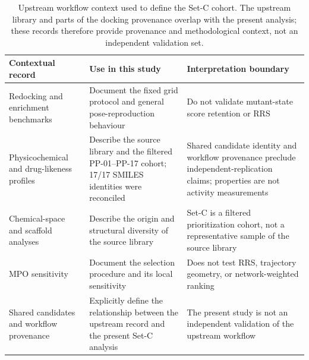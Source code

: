 \begin{table}[htbp]
\centering
\scriptsize
\caption{Upstream workflow context used to define the Set-C cohort. The upstream library and parts of the docking provenance overlap with the present analysis; these records therefore provide provenance and methodological context, not an independent validation set.}
\label{tab:s16_p1_context}
\begin{tabularx}{\textwidth}{>{\raggedright\arraybackslash}p{} >{\raggedright\arraybackslash}p{} X}
\toprule
Contextual record & Use in this study & Interpretation boundary \\
\midrule
Redocking and enrichment benchmarks & Document the fixed grid protocol and general pose-reproduction behaviour & Do not validate mutant-state score retention or RRS \\
Physicochemical and drug-likeness profiles & Describe the source library and the filtered PP-01--PP-17 cohort; 17/17 SMILES identities were reconciled & Shared candidate identity and workflow provenance preclude independent-replication claims; properties are not activity measurements \\
Chemical-space and scaffold analyses & Describe the origin and structural diversity of the source library & Set-C is a filtered prioritization cohort, not a representative sample of the source library \\
MPO sensitivity & Document the selection procedure and its local sensitivity & Does not test RRS, trajectory geometry, or network-weighted ranking \\
Shared candidates and workflow provenance & Explicitly define the relationship between the upstream record and the present Set-C analysis & The present study is not an independent validation of the upstream workflow \\
\bottomrule
\end{tabularx}
\end{table}
